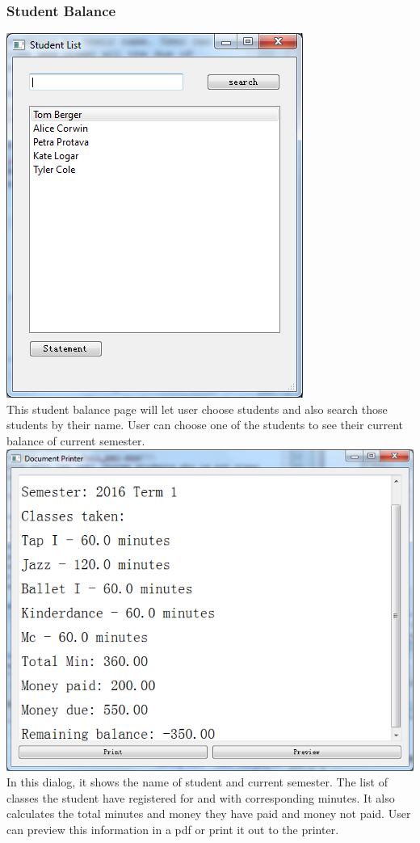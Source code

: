 \subsubsection{Student Balance}
\includegraphics[scale=0.5]{pics/balance_main.png}\\
This student balance page will let user choose students and also search those students by their name. User can choose one of the students to see their current balance of current semester. \\
\includegraphics[scale=0.5]{pics/balance_dialog.png}\\
In this dialog, it shows the name of student and current semester. The list of classes the student have registered for and with corresponding minutes. It also calculates the total minutes and money they have paid and money not paid. User can preview this information in a pdf or print it out to the printer.

